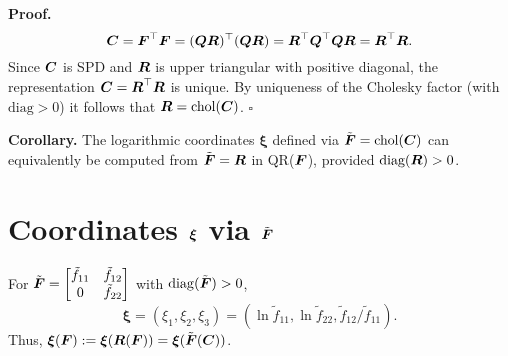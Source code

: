 \textbf{Proof.}
\begin{equation}
\boldsymbol{C} = \boldsymbol{F}^{\top}\boldsymbol{F} = (\boldsymbol{Q} \boldsymbol{R})^{\top}(\boldsymbol{Q} \boldsymbol{R}) = \boldsymbol{R}^{\top} \boldsymbol{Q}^{\top} \boldsymbol{Q} \boldsymbol{R} = \boldsymbol{R}^{\top} \boldsymbol{R}.
\end{equation}
Since $\boldsymbol{C}$ is SPD and $\boldsymbol{R}$ is upper triangular with positive diagonal, the representation $\boldsymbol{C} = \boldsymbol{R}^{\top}\boldsymbol{R}$ is unique. By uniqueness of the Cholesky factor (with $\text{diag} > 0$) it follows that $\boldsymbol{R} = \text{chol}(\boldsymbol{C})$. $\square$

\textbf{Corollary.} The logarithmic coordinates $\boldsymbol{\xi}$ defined via $\tilde{\boldsymbol{F}} = \text{chol}(\boldsymbol{C})$ can equivalently be computed from $\tilde{\boldsymbol{F}} = \boldsymbol{R}$ in QR($\boldsymbol{F}$), provided $\text{diag}(\boldsymbol{R}) > 0$.

\section{Coordinates $\boldsymbol{\xi}$ via $\tilde{\boldsymbol{F}}$}

For $\tilde{\boldsymbol{F}} = \begin{bmatrix} \tilde f_{11} & \tilde f_{12} \\ 0 & \tilde f_{22} \end{bmatrix}$ with $\operatorname{diag}(\tilde{\boldsymbol{F}}) > 0$,
\begin{equation}
\boldsymbol{\xi} = (\xi_1, \xi_2, \xi_3) = (\ln \tilde f_{11}, \ln \tilde f_{22}, \tilde f_{12}/\tilde f_{11}).
\end{equation}
Thus, $\boldsymbol{\xi}(\boldsymbol{F}) := \boldsymbol{\xi}(\boldsymbol{R}(\boldsymbol{F})) = \boldsymbol{\xi}(\tilde{\boldsymbol{F}}(\boldsymbol{C}))$.


